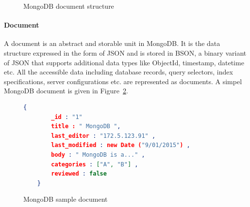 \begin{figure}[h]
	\centering
	\centering
	\caption{MongoDB document structure~\citep{mongodb:org}}
	\label{fig:mongodb-doc}
	
\end{figure}

\paragraph{Document}
	A document is an abstract and storable unit in MongoDB. It is the data structure expressed in the form of JSON and is stored in BSON, a binary variant of JSON that supports additional data types like ObjectId, timestamp, datetime etc. All the accessible data including database records, query selectors, index specifications, server configurations etc. are represented as documents. A simpel MongoDB document is given in Figure~\ref{sample-mongodb-document}.
	\begin{figure}[h]
	\begin{lstlisting}[language=JSON,basicstyle=\scriptsize]
	{
		_id : "1"
		title : " MongoDB ",
		last_editor : "172.5.123.91" ,
		last_modified : new Date ("9/01/2015") ,
		body : " MongoDB is a..." ,
		categories : ["A", "B"] ,
		reviewed : false
	}
	\end{lstlisting} 
	\caption{MongoDB sample document}
	\label{sample-mongodb-document}
\end{figure}

